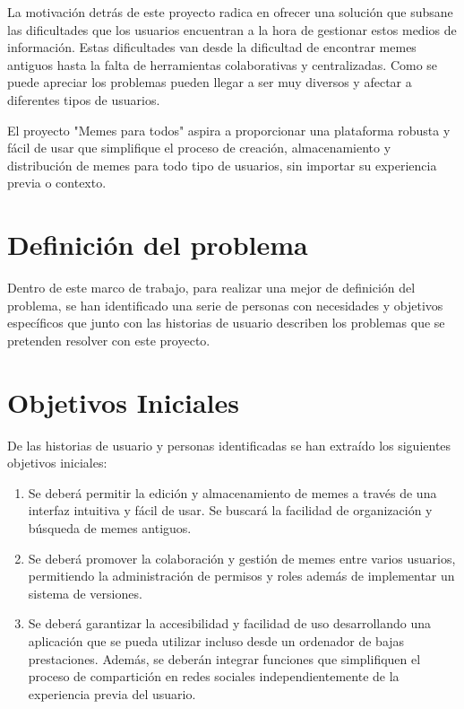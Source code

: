 La motivación detrás de este proyecto radica en ofrecer una solución que subsane las dificultades que los usuarios encuentran a la hora de gestionar estos medios de información. Estas dificultades van desde la dificultad de encontrar memes antiguos hasta la falta de herramientas colaborativas y centralizadas. Como se puede apreciar los problemas pueden llegar a ser muy diversos y afectar a diferentes tipos de usuarios.

El proyecto "Memes para todos" aspira a proporcionar una plataforma robusta y fácil de usar que simplifique el proceso de creación, almacenamiento y distribución de memes para todo tipo de usuarios, sin importar su experiencia previa o contexto.

\section{Definición del problema}

Dentro de este marco de trabajo, para realizar una mejor de definición del problema, se han identificado una serie de personas con necesidades y objetivos específicos que junto con las historias de usuario describen los problemas que se pretenden resolver con este proyecto.

\section{Objetivos Iniciales}

De las historias de usuario y personas identificadas se han extraído los siguientes objetivos iniciales:

\begin{enumerate}
    \item Se deberá permitir la edición y almacenamiento de memes a través de una interfaz intuitiva y fácil de usar. Se buscará la facilidad de organización y búsqueda de memes antiguos.
    \item Se deberá promover la colaboración y gestión de memes entre varios usuarios, permitiendo la administración de permisos y roles además de implementar un sistema de versiones.
    \item Se deberá garantizar la accesibilidad y facilidad de uso desarrollando una aplicación que se pueda utilizar incluso desde un ordenador de bajas prestaciones. Además, se deberán integrar funciones que simplifiquen el proceso de compartición en redes sociales independientemente de la experiencia previa del usuario.
\end{enumerate}